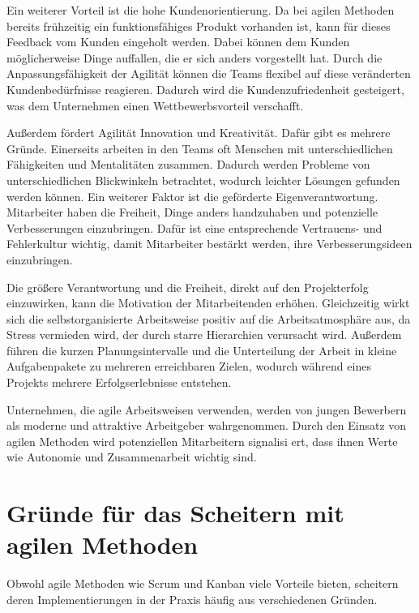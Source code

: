 \documentclass[ngerman]{seminarvorlage}
\begin{document}
Ein weiterer Vorteil ist die hohe Kundenorientierung. Da bei agilen Methoden bereits frühzeitig ein funktionsfähiges Produkt vorhanden ist, kann für dieses Feedback vom Kunden eingeholt werden. Dabei können dem Kunden möglicherweise Dinge auffallen, die er sich anders vorgestellt hat. Durch die Anpassungsfähigkeit der Agilität können die Teams flexibel auf diese veränderten Kundenbedürfnisse reagieren. Dadurch wird die Kundenzufriedenheit gesteigert, was dem Unternehmen einen Wettbewerbsvorteil verschafft.\cite{Theobald.2021,facebook.2024}

Außerdem fördert Agilität Innovation und Kreativität. Dafür gibt es mehrere Gründe. Einerseits arbeiten in den Teams oft Menschen mit unterschiedlichen Fähigkeiten und Mentalitäten zusammen. Dadurch werden Probleme von unterschiedlichen Blickwinkeln betrachtet, wodurch leichter Lösungen gefunden werden können.  Ein weiterer Faktor ist die geförderte Eigenverantwortung. Mitarbeiter haben die Freiheit, Dinge anders handzuhaben und potenzielle Verbesserungen einzubringen. Dafür ist eine entsprechende Vertrauens- und Fehlerkultur wichtig, damit Mitarbeiter bestärkt werden, ihre Verbesserungsideen einzubringen. \cite{Theobald.2021}

Die größere Verantwortung und die Freiheit, direkt auf den Projekterfolg einzuwirken, kann die Motivation der Mitarbeitenden erhöhen. Gleichzeitig wirkt sich die selbstorganisierte Arbeitsweise positiv auf die Arbeitsatmosphäre aus, da Stress vermieden wird, der durch starre Hierarchien verursacht wird. Außerdem führen die kurzen Planungsintervalle und die Unterteilung der Arbeit in kleine Aufgabenpakete zu mehreren erreichbaren Zielen, wodurch während eines Projekts mehrere Erfolgserlebnisse entstehen.\cite{Theobald.2021}

Unternehmen, die agile Arbeitsweisen verwenden, werden von jungen Bewerbern als moderne und attraktive Arbeitgeber wahrgenommen. Durch den Einsatz von agilen Methoden wird potenziellen Mitarbeitern signalisi
ert, dass ihnen Werte wie Autonomie und Zusammenarbeit wichtig sind.\cite{personio.2024}



\section{Gründe für das Scheitern mit agilen Methoden}

Obwohl agile Methoden wie Scrum und Kanban viele Vorteile bieten, scheitern deren Implementierungen in der Praxis häufig aus verschiedenen Gründen. \\
\end{document}
